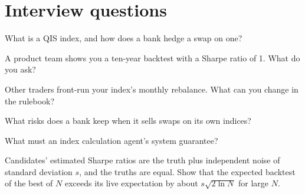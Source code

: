\section{Interview questions}

\begin{interviewq}\label{iq:s2:quantitative-investment-strategies:1}
What is a QIS index, and how does a bank hedge a swap on one?
\end{interviewq}

\begin{interviewq}\label{iq:s2:quantitative-investment-strategies:2}
A product team shows you a ten-year backtest with a Sharpe ratio of 1. What do you ask?
\end{interviewq}

\begin{interviewq}\label{iq:s2:quantitative-investment-strategies:3}
Other traders front-run your index's monthly rebalance. What can you change in the rulebook?
\end{interviewq}

\begin{interviewq}\label{iq:s2:quantitative-investment-strategies:4}
What risks does a bank keep when it sells swaps on its own indices?
\end{interviewq}

\begin{interviewq}\label{iq:s2:quantitative-investment-strategies:5}
What must an index calculation agent's system guarantee?
\end{interviewq}

\begin{interviewq}\label{iq:s2:quantitative-investment-strategies:6}
Candidates' estimated Sharpe ratios are the truth plus independent noise of standard deviation $s$, and the truths are equal. Show that the expected
backtest of the best of $N$ exceeds its live expectation by about $s\sqrt{2\ln N}$ for large $N$.
\end{interviewq}
